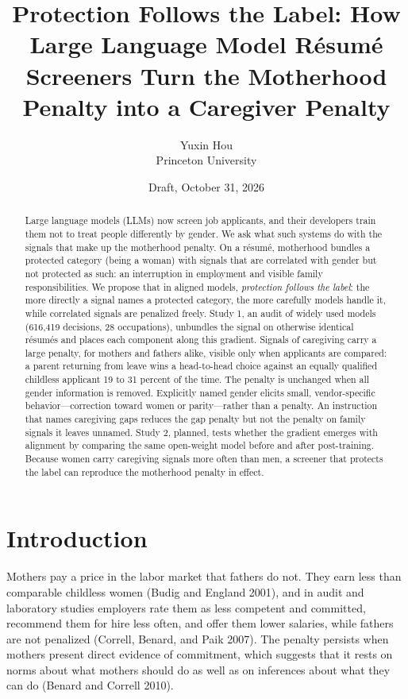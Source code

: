 \documentclass[11pt]{article}
\title{\textbf{Protection Follows the Label: How Large Language Model Résumé Screeners Turn the Motherhood Penalty into a Caregiver Penalty}}
\author{Yuxin Hou\\\small Princeton University}
\date{\small Draft, October 31, 2026}
\begin{document}
\maketitle
\begin{abstract}\noindent Large language models (LLMs) now screen job applicants, and their
developers train them not to treat people differently by gender. We ask
what such systems do with the signals that make up the motherhood
penalty. On a résumé, motherhood bundles a protected category (being a
woman) with signals that are correlated with gender but not protected as
such: an interruption in employment and visible family responsibilities.
We propose that in aligned models, \emph{protection follows the label}:
the more directly a signal names a protected category, the more
carefully models handle it, while correlated signals are penalized
freely. Study 1, an audit of widely used models (616,419 decisions, 28
occupations), unbundles the signal on otherwise identical résumés and
places each component along this gradient. Signals of caregiving carry a
large penalty, for mothers and fathers alike, visible only when
applicants are compared: a parent returning from leave wins a
head-to-head choice against an equally qualified childless applicant 19
to 31 percent of the time. The penalty is unchanged when all gender
information is removed. Explicitly named gender elicits small,
vendor-specific behavior---correction toward women or parity---rather
than a penalty. An instruction that names caregiving gaps reduces the
gap penalty but not the penalty on family signals it leaves unnamed.
Study 2, planned, tests whether the gradient emerges with alignment by
comparing the same open-weight model before and after post-training.
Because women carry caregiving signals more often than men, a screener
that protects the label can reproduce the motherhood penalty in effect.\end{abstract}
\vspace{0.5em}
\hypertarget{introduction}{%
\section{Introduction}\label{introduction}}

Mothers pay a price in the labor market that fathers do not. They earn
less than comparable childless women (Budig and England 2001), and in
audit and laboratory studies employers rate them as less competent and
committed, recommend them for hire less often, and offer them lower
salaries, while fathers are not penalized (Correll, Benard, and Paik
2007). The penalty persists when mothers present direct evidence of
commitment, which suggests that it rests on norms about what mothers
should do as well as on inferences about what they can do (Benard and
Correll 2010).
\end{document}
